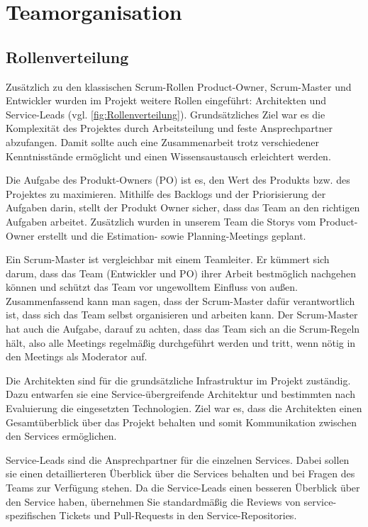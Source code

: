 
\chapter{Teamorganisation} \label{team_orga}

\section{Rollenverteilung}
    Zusätzlich zu den klassischen Scrum-Rollen Product-Owner, Scrum-Master und Entwickler 
    wurden im Projekt weitere Rollen eingeführt: Architekten und Service-Leads (vgl. \ref*{fig:Rollenverteilung}). 
    Grundsätzliches Ziel war es die Komplexität des Projektes durch Arbeitsteilung und feste Ansprechpartner abzufangen.
    Damit sollte auch eine Zusammenarbeit trotz verschiedener Kenntnisstände ermöglicht und einen Wissensaustausch erleichtert werden.

    Die Aufgabe des Produkt-Owners (PO) ist es, den Wert des Produkts bzw. des Projektes
    zu maximieren. Mithilfe des Backlogs und der Priorisierung der Aufgaben darin, stellt der Produkt Owner
    sicher, dass das Team an den richtigen Aufgaben arbeitet.
    Zusätzlich wurden in unserem Team die Storys vom Product-Owner erstellt und die Estimation- sowie Planning-Meetings geplant.

    Ein Scrum-Master ist vergleichbar mit einem Teamleiter. Er kümmert sich darum, dass
    das Team (Entwickler und PO) ihrer Arbeit bestmöglich nachgehen können und schützt
    das Team vor ungewolltem Einfluss von außen. Zusammenfassend kann
    man sagen, dass der Scrum-Master dafür verantwortlich ist, dass sich das Team selbst
    organisieren und arbeiten kann. Der Scrum-Master hat auch die Aufgabe, darauf zu achten, dass das Team sich an die
    Scrum-Regeln hält, also alle Meetings regelmäßig durchgeführt werden und tritt, wenn nötig in den Meetings als Moderator auf.

    Die Architekten sind für die grundsätzliche Infrastruktur im Projekt zuständig. 
    Dazu entwarfen sie eine Service-übergreifende Architektur und bestimmten nach Evaluierung die eingesetzten Technologien.
    Ziel war es, dass die Architekten einen Gesamtüberblick über das Projekt behalten
    und somit Kommunikation zwischen den Services ermöglichen.
     
    
    Service-Leads sind die Ansprechpartner für die einzelnen Services. Dabei sollen sie einen detaillierteren Überblick über die Services behalten 
    und bei Fragen des Teams zur Verfügung stehen. 
    Da die Service-Leads einen besseren Überblick über den Service haben, 
    übernehmen Sie standardmäßig die Reviews von service-spezifischen Tickets und Pull-Requests in den Service-Repositories.

